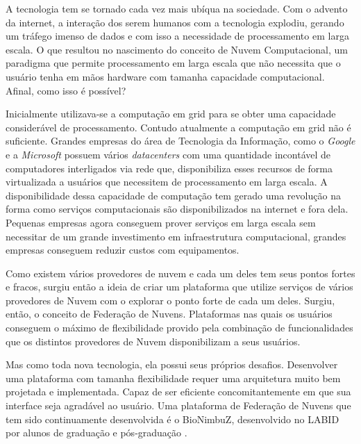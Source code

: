 A tecnologia tem se tornado cada vez mais ubíqua na sociedade. Com o advento da internet, a interação dos serem humanos com a tecnologia explodiu, gerando um tráfego imenso de dados e com isso a necessidade de processamento em larga escala. O que resultou no nascimento do conceito de Nuvem Computacional, um paradigma que permite processamento em larga escala que não necessita que o usuário tenha em mãos hardware com tamanha capacidade computacional. Afinal, como isso é possível?

Inicialmente utilizava-se a computação em grid para se obter uma capacidade considerável de processamento. Contudo atualmente a computação em grid não é suficiente. Grandes empresas do área de Tecnologia da Informação, como o \textit{Google} e a \textit{Microsoft} possuem vários \textit{datacenters} com uma quantidade incontável de computadores interligados via rede que, disponibiliza esses recursos de forma virtualizada a usuários que necessitem de processamento em larga escala. A disponibilidade dessa capacidade de computação tem gerado uma revolução na forma como serviços computacionais são disponibilizados na internet e fora dela.
Pequenas empresas agora conseguem prover serviços em larga escala sem necessitar de um grande investimento em infraestrutura computacional, grandes empresas conseguem reduzir custos com equipamentos.

Como existem vários provedores de nuvem e cada um deles tem seus pontos fortes e fracos, surgiu então a ideia de criar um plataforma que utilize serviços de vários provedores de Nuvem com o explorar o ponto forte de cada um deles. Surgiu, então, o conceito de Federação de Nuvens. Plataformas nas quais os usuários conseguem o máximo de flexibilidade provido pela combinação de funcionalidades que os distintos provedores de Nuvem disponibilizam a seus usuários.

Mas como toda nova tecnologia, ela possui seus próprios desafios. Desenvolver uma plataforma com tamanha flexibilidade requer uma arquitetura muito bem projetada e implementada. Capaz de ser eficiente concomitantemente em que sua interface seja agradável ao usuário. Uma plataforma de Federação de Nuvens que tem sido continuamente desenvolvida é o BioNimbuZ, desenvolvido no \acrfull{LABID} por alunos de graduação e pós-graduação \cite{BioNimbuZ_Breno_Deric} \cite{BioNimbuZ_Closer} \cite{BioNimbuZ_6846526} \cite{Saldanha2012} \cite{6732620_BioNimbuZ_ACOsched} \cite{BioNimbuZ_Willian_C99} \cite{closer12_BioNimbuZ_AHP} \cite{Saldanha_BioNimbus}.







